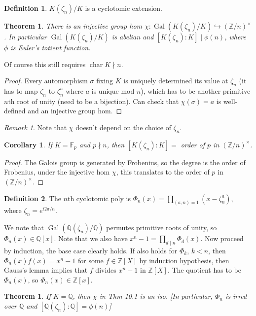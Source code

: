 \documentclass{article}
\theoremstyle{definition}
\newtheorem*{defn*}{Definition}
\theoremstyle{remark}
\newtheorem{rem}{Remark}
\theoremstyle{plain}
\newtheorem{thm}[defn]{Theorem}
\newtheorem{crly}[defn]{Corollary}
\newcommand{\ZZ}{\mathbb{Z}}
\newcommand{\QQ}{\mathbb{Q}}
\newcommand{\FF}{\mathbb{F}}
\newcommand{\Gal}{\operatorname{Gal}}
\begin{document}
\begin{defn*}
    $K(\zeta_n)/K$ is a cyclotomic extension.
\end{defn*}
\begin{thm}
    There is an injective group hom $\chi:\Gal(K(\zeta_n)/K)\hookrightarrow (\ZZ/n)^\times$. In particular $\Gal(K(\zeta_n)/K)$ is abelian and $[K(\zeta_n):K]\mid \phi(n)$, where $\phi$ is Euler's totient function.
\end{thm}
Of course this still requires $\operatorname{char}K\nmid  n$.
\begin{proof}
    Every automorphism $\sigma$ fixing $K$ is uniquely determined its value at $\zeta_n$ (it has to map $\zeta_n$ to $\zeta_n^a$ where $a$ is unique mod $n$), which has to be another primitive $n$th root of unity (need to be a bijection). Can check that $\chi(\sigma)=a$ is well-defined and an injective group hom.
\end{proof}
\begin{rem}
    Note that $\chi$ doesn't depend on the choice of $\zeta_n$.
\end{rem}
\begin{crly}
    If $K=\FF_p$ and $p\nmid n$, then $[K(\zeta_n):K]=$ order of $p$ in $(\ZZ/n)^\times$.
\end{crly}
\begin{proof}
    The Galois group is generated by Frobenius, so the degree is the order of Frobenius, under the injective hom $\chi$, this translates to the order of $p$ in $(\ZZ/n)^\times$.
\end{proof}
\begin{defn*}
    The $n$th cyclotomic poly is $\Phi_n(x)=\prod_{(a,n)=1}(x-\zeta_n^a)$, where $\zeta_n=e^{i2\pi /n}$.
\end{defn*}
We note that $\Gal(\QQ(\zeta_n)/\QQ)$ permutes primitive roots of unity, so $\Phi_n(x)\in\QQ[x]$. Note that we also have $x^n-1=\prod_{d\mid n}\Phi_d(x)$. Now proceed by induction, the base case clearly holds. If also holds for $\Phi_k$, $k<n$, then $\Phi_n(x)f(x)=x^n-1$ for some $f\in \ZZ[X]$ by induction hypothesis, then Gauss's lemma implies that $f$ divides $x^n-1$ in $\ZZ[X]$. The quotient has to be $\Phi_n(x)$, so $\Phi_n(x)\in\ZZ[x]$.
\begin{thm}
    If $K=\QQ$, then $\chi$ in Thm 10.1 is an iso. [In particular, $\Phi_n$ is irred over $\QQ$ and $[\QQ(\zeta_n):\QQ]=\phi(n)$]
\end{thm}
\end{document}
